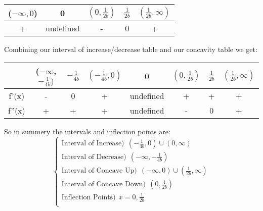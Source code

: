 \documentclass[11pt]{article}
\begin{document}
\begin{center}
 \begin{tabular}{||c c c c c||} 
 \hline
 ($-\infty, 0$) & 0 & $(0, \frac{1}{2b})$ &  $\frac{1}{2b}$ & $( \frac{1}{2b},\infty)$  \\ [0.5ex] 
 \hline\hline
 + &  undefined & -  & 0 & +\\ 
 \hline
\end{tabular}
\end{center}
Combining our interval of increase/decrease table and our concavity table we get:
\begin{center}
 \begin{tabular}{|c |c c c c c c c||} 
 \hline
 &($-\infty$, $-\frac{1}{4b})$ & $-\frac{1}{4b}$ & $(-\frac{1}{4b}, 0)$ &  0 & $(0, \frac{1}{2b})$ &  $\frac{1}{2b}$ & $( \frac{1}{2b},\infty)$  \\ [0.5ex] 
 \hline\hline
 f'(x) &- & 0  & + & undefined & +  & + & +\\ 
 \hline
 f''(x) &+ &  + & + & undefined & - & 0 & +\\ 
\hline
\end{tabular}
\end{center}
So in summery the intervals and inflection points are:
$$
\begin{cases}
\text{Interval of Increase}) \ \  (-\frac{1}{4b}, 0) \cup (0,\infty) \\
\text{Interval of Decrease}) \ \ (-\infty, -\frac{1}{4b}) \\
\text{Interval of Concave Up}) \ \ (-\infty, 0) \cup ( \frac{1}{2b},\infty) \\
\text{Interval of Concave Down}) \ \ (0, \frac{1}{2b}) \\
\text{Inflection Points}) \ \ x = 0,   \frac{1}{2b} \\
\end{cases}
$$
\end{document}
